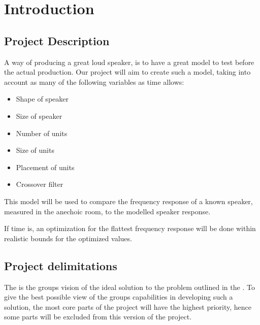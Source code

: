 
\chapter{Introduction}
\label{sec:introduction}

\section{Project Description}
\label{sec:projectDescription}
A way of producing a great loud speaker, is to have a great model to test before the actual production. Our project will aim to create such a model, taking into account as many of the following variables as time allows:

\begin{itemize}
	\item Shape of speaker
	\item Size of speaker
	\item Number of units
	\item Size of units
	\item Placement of units
	\item Crossover filter
\end{itemize}

This model will be used to compare the frequency response of a known speaker, measured in the anechoic room, to the modelled speaker response.

If time is, an optimization for the flattest frequency response will be done within realistic bounds for the optimized values.


\section{Project delimitations}
\label{sec:delimitations}
The  is the groups vision of the ideal solution to the problem outlined in the .  
To give the best possible view of the groups capabilities in developing such a solution, the most core parts of the project will have the highest priority, hence some parts will be excluded from this version of the project.

